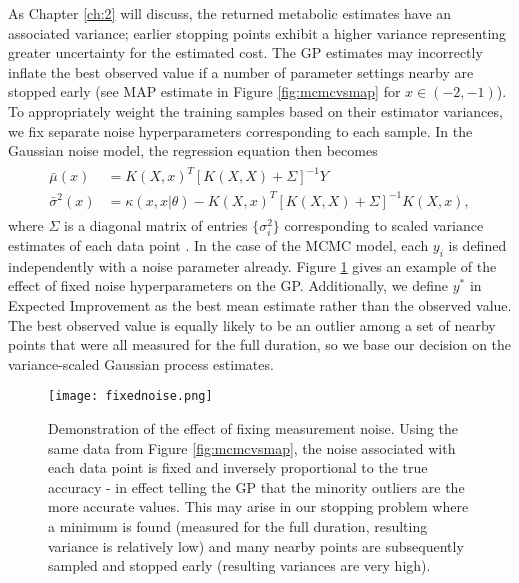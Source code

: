 As Chapter \ref{ch:2} will discuss, the returned metabolic estimates have an associated variance; earlier stopping points exhibit a higher variance representing greater uncertainty for the estimated cost. The GP estimates may incorrectly inflate the best observed value if a number of parameter settings nearby are stopped early (see MAP estimate in Figure \ref{fig:mcmcvsmap} for $x\in(-2, -1)$). To appropriately weight the training samples based on their estimator variances, we fix separate noise hyperparameters corresponding to each sample. In the Gaussian noise model, the regression equation then becomes
\begin{align}
\begin{split}
  \bar{\mu}(x) &= K(X, x)^T[K(X, X) + \Sigma]^{-1}Y \\
  \bar{\sigma}^2(x) &= \kappa(x, x\vert \theta) - K(X, x)^T[K(X,X) + \Sigma]^{-1}K(X,x),
\end{split}
\end{align}
where $\Sigma$ is a diagonal matrix of entries $\{\sigma_i^2\}$ corresponding to scaled variance estimates of each data point \citep{Kersting:2007:MLH:1273496.1273546}. In the case of the MCMC model, each $y_i$ is defined independently with a noise parameter already. Figure \ref{fig:fixednoise} gives an example of the effect of fixed noise hyperparameters on the GP. Additionally, we define $y^*$ in Expected Improvement as the best mean estimate rather than the observed value. The best observed value is equally likely to be an outlier among a set of nearby points that were all measured for the full duration, so we base our decision on the variance-scaled Gaussian process estimates.

\begin{figure}[ht]
\texttt{[image: fixednoise.png]}
\caption{Demonstration of the effect of fixing measurement noise. Using the same data from Figure \ref{fig:mcmcvsmap}, the noise associated with each data point is fixed and inversely proportional to the true accuracy - in effect telling the GP that the minority outliers are the more accurate values. This may arise in our stopping problem where a minimum is found (measured for the full duration, resulting variance is relatively low) and many nearby points are subsequently sampled and stopped early (resulting variances are very high).}
\label{fig:fixednoise}
\end{figure}